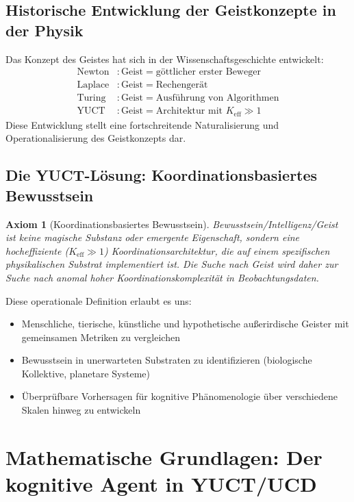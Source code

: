 \documentclass[12pt,a4paper]{article}
\newtheorem{axiom}{Axiom}
\newcommand{\eff}{\mathrm{eff}}
\newcommand{\Ke}{K_{\eff}}
\begin{document}
	\subsection{Historische Entwicklung der Geistkonzepte in der Physik}
	
	Das Konzept des Geistes hat sich in der Wissenschaftsgeschichte entwickelt:
	\[
	\begin{aligned}
		\text{Newton} &: \text{Geist} = \text{göttlicher erster Beweger} \\
		\text{Laplace} &: \text{Geist} = \text{Rechengerät} \\
		\text{Turing} &: \text{Geist} = \text{Ausführung von Algorithmen} \\
		\text{YUCT} &: \text{Geist} = \text{Architektur mit } \Ke \gg 1
	\end{aligned}
	\]
	Diese Entwicklung stellt eine fortschreitende Naturalisierung und Operationalisierung des Geistkonzepts dar.
	
	\subsection{Die YUCT-Lösung: Koordinationsbasiertes Bewusstsein}
	
	\begin{axiom}[Koordinationsbasiertes Bewusstsein]
		Bewusstsein/Intelligenz/Geist ist keine magische Substanz oder emergente Eigenschaft, sondern eine hocheffiziente (\(\Ke \gg 1\)) Koordinationsarchitektur, die auf einem spezifischen physikalischen Substrat implementiert ist. Die Suche nach Geist wird daher zur Suche nach anomal hoher Koordinationskomplexität in Beobachtungsdaten.
	\end{axiom}
	
	Diese operationale Definition erlaubt es uns:
	\begin{itemize}
		\item Menschliche, tierische, künstliche und hypothetische außerirdische Geister mit gemeinsamen Metriken zu vergleichen
		\item Bewusstsein in unerwarteten Substraten zu identifizieren (biologische Kollektive, planetare Systeme)
		\item Überprüfbare Vorhersagen für kognitive Phänomenologie über verschiedene Skalen hinweg zu entwickeln
	\end{itemize}
	
	\section{Mathematische Grundlagen: Der kognitive Agent in YUCT/UCD}
	
\end{document}
